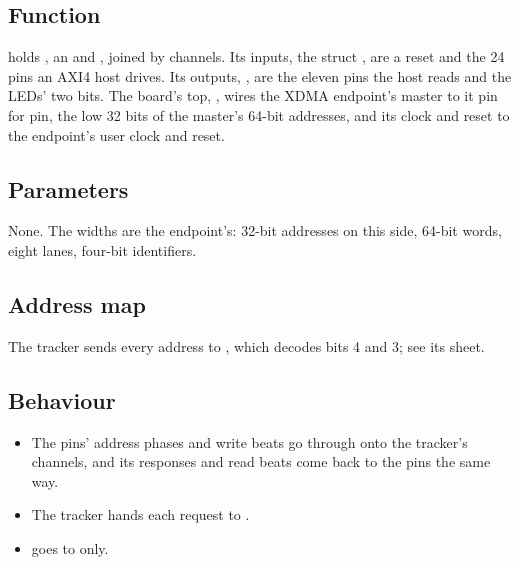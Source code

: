 
%
{}

\subsection*{Function}

 holds , an
 and , joined by channels.
Its inputs, the struct , are a reset and the 24 pins an
AXI4 host drives. Its outputs, , are the eleven pins
the host reads and the LEDs' two bits. The board's top,
, wires the XDMA endpoint's master to it
pin for pin, the low 32 bits of the master's 64-bit addresses, and its
clock and reset to the endpoint's user clock and reset.

\subsection*{Parameters}

None. The widths are the endpoint's: 32-bit addresses on this side,
64-bit words, eight lanes, four-bit identifiers.

\subsection*{Address map}

The tracker sends every address to , which decodes bits 4
and 3; see its sheet.


\subsection*{Behaviour}

\begin{itemize}
\item The pins' address phases and write beats go through
 onto the tracker's channels, and its responses and read
beats come back to the pins the same way.
\item The tracker hands each request to .
\item {} goes to  only.
\end{itemize}


